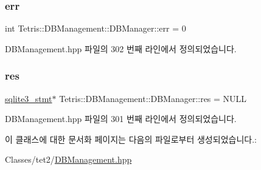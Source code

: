 \subsubsection{\texorpdfstring{err}{err}}
{\footnotesize\ttfamily int Tetris\+::\+D\+B\+Management\+::\+D\+B\+Manager\+::err = 0\hspace{0.3cm}{\ttfamily [private]}}



D\+B\+Management.\+hpp 파일의 302 번째 라인에서 정의되었습니다.

\mbox{\label{class_tetris_1_1_d_b_management_1_1_d_b_manager_af161e9c2d2f9dea602bea867542deedb}} 
\subsubsection{\texorpdfstring{res}{res}}
{\footnotesize\ttfamily \hyperlink{sqlite3_8h_af2a033da1327cdd77f0a174a09aedd0c}{sqlite3\+\_\+stmt}$\ast$ Tetris\+::\+D\+B\+Management\+::\+D\+B\+Manager\+::res = N\+U\+LL\hspace{0.3cm}{\ttfamily [private]}}



D\+B\+Management.\+hpp 파일의 301 번째 라인에서 정의되었습니다.



이 클래스에 대한 문서화 페이지는 다음의 파일로부터 생성되었습니다.\+:\begin{DoxyCompactItemize}
\item 
Classes/tet2/\hyperlink{_d_b_management_8hpp}{D\+B\+Management.\+hpp}\end{DoxyCompactItemize}
